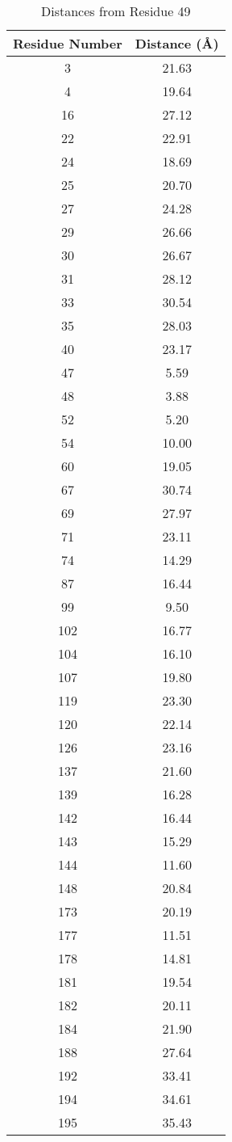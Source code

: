 \documentclass{article}
\begin{document}
\begin{table}[h]
    \centering
    \caption{Distances from Residue 49}
    \begin{tabular}{@{}cc@{}}
        \toprule
        \textbf{Residue Number} & \textbf{Distance (Å)} \\ \midrule
        3   & 21.63 \\
        4   & 19.64 \\
        16  & 27.12 \\
        22  & 22.91 \\
        24  & 18.69 \\
        25  & 20.70 \\
        27  & 24.28 \\
        29  & 26.66 \\
        30  & 26.67 \\
        31  & 28.12 \\
        33  & 30.54 \\
        35  & 28.03 \\
        40  & 23.17 \\
        47  & 5.59  \\
        48  & 3.88  \\
        52  & 5.20  \\
        54  & 10.00 \\
        60  & 19.05 \\
        67  & 30.74 \\
        69  & 27.97 \\
        71  & 23.11 \\
        74  & 14.29 \\
        87  & 16.44 \\
        99  & 9.50  \\
        102 & 16.77 \\
        104 & 16.10 \\
        107 & 19.80 \\
        119 & 23.30 \\
        120 & 22.14 \\
        126 & 23.16 \\
        137 & 21.60 \\
        139 & 16.28 \\
        142 & 16.44 \\
        143 & 15.29 \\
        144 & 11.60 \\
        148 & 20.84 \\
        173 & 20.19 \\
        177 & 11.51 \\
        178 & 14.81 \\
        181 & 19.54 \\
        182 & 20.11 \\
        184 & 21.90 \\
        188 & 27.64 \\
        192 & 33.41 \\
        194 & 34.61 \\
        195 & 35.43 \\ \bottomrule
    \end{tabular}
    \label{tab:distances}
\end{table}
\end{document}
